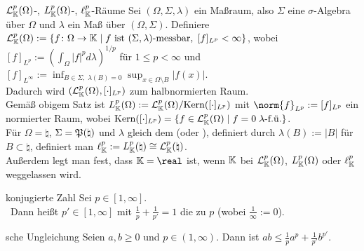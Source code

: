 \begin{Def}{$\mathcal{L}^p_{\mathbb{K}}(\Omega)$-, $L^p_{\mathbb{K}}(\Omega)$-, $\ell^p_{\mathbb{K}}$-Räume}
    Sei $(\Omega, \Sigma, \lambda)$ ein Maßraum,
    also $\Sigma$ eine $\sigma$-Algebra über $\Omega$ und $\lambda$ ein Maß über
    $(\Omega, \Sigma)$.
    Definiere $\mathcal{L}^p_{\mathbb{K}}(\Omega) := \{f\colon \Omega \rightarrow \mathbb{K} \;|\;
    f \text{ ist } (\Sigma, \lambda)\text{-messbar},\; [f]_{L^p} < \infty\}$, wobei
    $[f]_{L^p} := \left(\int_\Omega |f|^p d\lambda\right)^{1/p}$ für $1 \le p < \infty$
    und $[f]_{L^\infty} := \inf_{B \in \Sigma,\; \lambda(B) = 0} \sup_{x \in \Omega \setminus B}
    |f(x)|$.\\
    Dadurch wird $(\mathcal{L}^p_{\mathbb{K}}(\Omega), [\cdot]_{L^p})$ zum halbnormierten Raum.\\
    Gemäß obigem Satz ist $L^p_{\mathbb{K}}(\Omega) := \mathcal{L}^p_{\mathbb{K}}(\Omega)/\text{Kern}([\cdot]_{L^p})$
    mit $\norm{f}_{L^p} := [f]_{L^p}$ ein normierter Raum,
    wobei $\text{Kern}([\cdot]_{L^p}) = \{f \in \mathcal{L}^p_{\mathbb{K}}(\Omega) \;|\; f = 0 \;\lambda\text{-f.ü.}\}$.\\
    Für $\Omega = \natural$, $\Sigma = \mathfrak{P}(\natural)$ und $\lambda$ gleich
    dem  (oder ), definiert durch $\lambda(B) := |B|$ für
    $B \subset \natural$, definiert man $\ell^p_{\mathbb{K}} := L^p_{\mathbb{K}}(\natural) \cong
    \mathcal{L}^p_{\mathbb{K}}(\natural)$.\\
    Außerdem legt man fest, dass $\KK = \real$ ist, wenn $\mathbb{K}$
    bei $\mathcal{L}^p_{\mathbb{K}}(\Omega)$, $L^p_{\mathbb{K}}(\Omega)$ oder $\ell^p_{\mathbb{K}}$ weggelassen wird.
\end{Def}


\begin{Def}{konjugierte Zahl}
    Sei $p \in [1, \infty]$.\\\
    Dann heißt $p' \in [1, \infty]$ mit $\frac{1}{p} + \frac{1}{p'} = 1$ die zu $p$
    \begriff{konjugierte Zahl}
    (wobei $\frac{1}{\infty} := 0$).
\end{Def}

\begin{Lemma}{sche Ungleichung}
    Seien $a, b \ge 0$ und $p \in (1, \infty)$.
    Dann ist $ab \le \frac{1}{p} a^p + \frac{1}{p'} b^{p'}$.
\end{Lemma}

